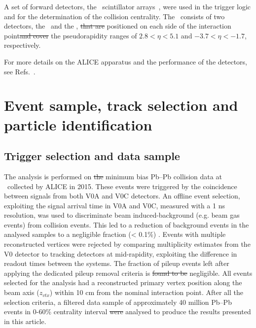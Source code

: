 \documentclass[ALICE,manyauthors]{cernphprep}
\providecommand{\DIFaddtex}[1]{{\protect\color{blue}\uwave{#1}}} %
\providecommand{\DIFdeltex}[1]{{\protect\color{red}\sout{#1}}}                      %
\providecommand{\DIFaddbegin}{} %
\providecommand{\DIFaddend}{} %
\providecommand{\DIFdelbegin}{} %
\providecommand{\DIFdelend}{} %
\providecommand{\DIFadd}[1]{\texorpdfstring{\DIFaddtex{#1}}{#1}} %
\providecommand{\DIFdel}[1]{\texorpdfstring{\DIFdeltex{#1}}{}} %
\begin{document}
A set of forward detectors, the \VZERO~scintillator arrays~\cite{Abbas:2013taa}, were used in the trigger logic and for the determination of the collision centrality. The \VZERO~consists of two detectors, the \VZEROA~and the \VZEROC, \DIFdelbegin \DIFdel{that are }\DIFdelend positioned on each side of the interaction point\DIFdelbegin \DIFdel{and cover }\DIFdelend \DIFaddbegin \DIFadd{, covering }\DIFaddend the pseudorapidity ranges of $2.8 < \eta < 5.1$ and $-3.7 < \eta < -1.7$, respectively. 

For more details on the ALICE apparatus and the performance of the detectors, see Refs.~\cite{Aamodt:2008zz,Abelev:2014ffa}.

\newpage
\section{Event sample, track selection and particle identification}
\label{Sec:EventTrackIdentification}
\subsection{Trigger selection and data sample}
\label{SubSec:Event}
The analysis is performed on \DIFdelbegin \DIFdel{the }\DIFdelend minimum bias Pb--Pb collision data at \sNN~collected by ALICE in 2015. These events were triggered by the coincidence between signals from both V0A and V0C detectors. An offline event selection, exploiting the signal arrival time in V0A and V0C, measured with a 1 ns resolution, was used to discriminate beam induced-background (e.g. beam gas events) from collision events. This led to a reduction of background events in the analysed samples to a negligible fraction (< 0.1\%) \cite{Abelev:2014ffa}. Events with multiple reconstructed vertices were rejected by comparing multiplicity estimates from the V0 detector to tracking detectors at mid-rapidity, exploiting the difference in readout times between the systems. The fraction of pileup events left after applying the dedicated pileup removal criteria is \DIFdelbegin \DIFdel{found to be }\DIFdelend negligible. All events selected for the analysis had a reconstructed primary vertex position along the beam axis ($z_{vtx}$) within 10 cm from the nominal interaction point. After all the selection criteria, a filtered data sample of approximately 40 million Pb--Pb events in 0-60\% centrality interval \DIFdelbegin \DIFdel{were }\DIFdelend \DIFaddbegin \DIFadd{was }\DIFaddend analysed to produce the results presented in this article.
\end{document}
